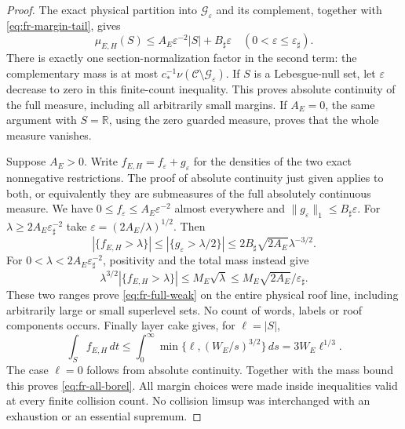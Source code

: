 \begin{proof}
The exact physical partition into $\mathcal G_\varepsilon$ and its
complement, together with \eqref{eq:fr-margin-tail}, gives
\begin{equation}\label{eq:fr-finite-exhaustion}
 \mu_{E,H}(S)
 \le A_E\varepsilon^{-2}|S|+B_\sharp\varepsilon
 \quad(0<\varepsilon\le\varepsilon_\sharp).
\end{equation}
There is exactly one section-normalization factor in the second term:
the complementary mass is at most
$c_*^{-1}\nu(\mathcal C\setminus\mathcal G_\varepsilon)$.
If $S$ is a Lebesgue-null set, let $\varepsilon$ decrease to zero
in this finite-count inequality.  This proves absolute continuity
of the full measure, including all arbitrarily small margins.
If $A_E=0$, the same argument with $S=\mathbb R$, using the zero
guarded measure, proves that the whole measure vanishes.

Suppose $A_E>0$.  Write $f_{E,H}=f_\varepsilon+g_\varepsilon$
for the densities of the two exact nonnegative restrictions.
The proof of absolute continuity just given applies to both, or
equivalently they are submeasures of the full absolutely continuous
measure.  We have
$0\le f_\varepsilon\le A_E\varepsilon^{-2}$ almost everywhere
and $\|g_\varepsilon\|_1\le B_\sharp\varepsilon$.
For $\lambda\ge2A_E\varepsilon_\sharp^{-2}$ take
$\varepsilon=(2A_E/\lambda)^{1/2}$.  Then
\[
 |\{f_{E,H}>\lambda\}|
 \le |\{g_\varepsilon>\lambda/2\}|
 \le 2B_\sharp\sqrt{2A_E}\lambda^{-3/2}.
\]
For $0<\lambda<2A_E\varepsilon_\sharp^{-2}$, positivity and
the total mass instead give
\[
 \lambda^{3/2}|\{f_{E,H}>\lambda\}|
 \le M_E\sqrt\lambda
 \le M_E\sqrt{2A_E}/\varepsilon_\sharp.
\]
These two ranges prove \eqref{eq:fr-full-weak} on the entire
physical roof line, including arbitrarily large or small superlevel
sets.  No count of words, labels or roof components occurs.
Finally layer cake gives, for $\ell=|S|$,
\[
 \int_S f_{E,H}\,dt
 \le\int_0^\infty\min\{\ell,(W_E/s)^{3/2}\}\,ds
       =3W_E\ell^{1/3}.
\]
The case $\ell=0$ follows from absolute continuity.  Together with
the mass bound this proves \eqref{eq:fr-all-borel}.
All margin choices were made inside inequalities valid at every
finite collision count.  No collision limsup was interchanged with
an exhaustion or an essential supremum.
\end{proof}


